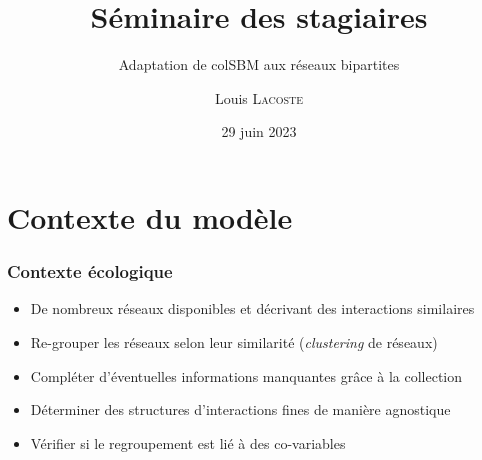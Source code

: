 \documentclass{beamer}
\title{Séminaire des stagiaires}
\subtitle{Adaptation de colSBM aux réseaux bipartites}
\author[L. Lacoste]{Louis \textsc{Lacoste}}
\date{29 juin 2023}
\begin{document}
\begin{frame}
    \maketitle
\end{frame}

\section{Contexte du modèle}
\begin{frame}
    \frametitle{Contexte écologique}
    \begin{itemize}
        \item De nombreux réseaux disponibles \parencite{WebLifeEcological} et décrivant des interactions similaires
        \item Re-grouper les réseaux selon leur similarité (\emph{clustering} de réseaux)
        \item Compléter d'éventuelles informations manquantes grâce à la collection
        \item Déterminer des structures d'interactions fines de manière agnostique
        \item Vérifier si le regroupement est lié à des co-variables
    \end{itemize}
\end{frame}
\end{document}
